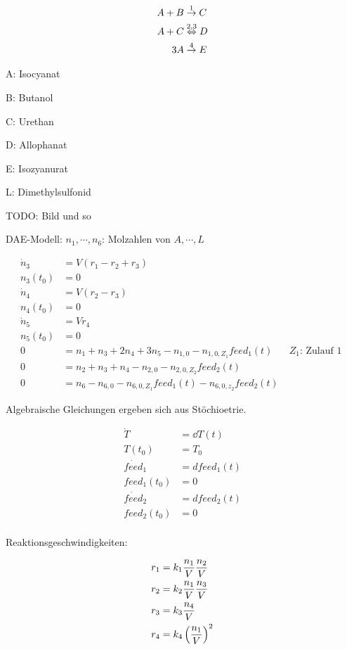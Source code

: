 

\begin{align*}
A + B & \stackrel{1}{\to} C \\
A + C &\stackrel{2,3}{\Leftrightarrow} D \\
3 A & \stackrel{4}{\to} E
\end{align*}

\bitm
\item A: Isocyanat
\item B: Butanol
\item C: Urethan
\item D: Allophanat
\item E: Isozyanurat
\item L: Dimethylsulfonid
\eitm

TODO: Bild und so

DAE-Modell: $n_1, \cdots, n_6$: Molzahlen von $A,\cdots,L$

\begin{align*}
\dot n_3 &= V (r_1 - r_2 + r_3) \\
n_3(t_0) &= 0 \\
\dot n_4 &= V(r_2 - r_3) \\
n_4(t_0) &= 0 \\
\dot n_5 &= V r_4 \\
n_5(t_0) &= 0 \\
0 &= n_1 + n_3 + 2n_4 + 3n_5 - n_{1,0} - n_{1,0,Z_1} feed_1(t) \quad \text{ $Z_1$: Zulauf 1 } \\
0 &= n_2 + n_3 + n_4 - n_{2,0} - n_{2,0,Z_2} feed_2(t) \\
0 &= n_6 - n_{6,0} - n_{6,0,Z_1} feed_1(t) - n_{6,0,z_2} feed_2(t) 
\end{align*}

Algebraische Gleichungen ergeben sich aus Stöchioetrie.

\begin{align*}
\dot T &= \dd T (t) \\
T(t_0) &= T_0 \\
\dot{feed}_1 &= dfeed_1(t) \\
feed_1(t_0) &= 0 \\
\dot{feed}_2 &= dfeed_2(t) \\
feed_2(t_0) &= 0 \\
\end{align*}

Reaktionsgeschwindigkeiten:

\begin{align*}
r_1 &= k_1 \frac{n_1}V \frac{n_2}V \\
r_2 &= k_2 \frac{n_1}V \frac{n_3}V \\
r_3 &= k_3 \frac{n_4}V \\
r_4 &= k_4 \left( \frac{n_1}V \right)^2
\end{align*}

